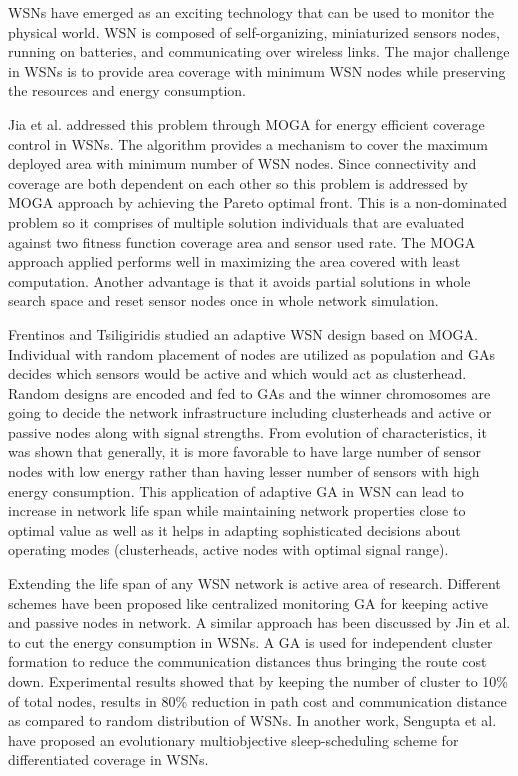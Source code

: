 \documentclass[journal]{IEEEtran}
\begin{document}
WSNs have emerged as an exciting technology that can be used to monitor the physical world. WSN is composed of self-organizing, miniaturized sensors nodes, running on batteries, and communicating over wireless links. The major challenge in WSNs is to provide area coverage with minimum WSN nodes while preserving the resources and energy consumption.

Jia et al. \cite{jia2009energy} addressed this problem through MOGA for energy efficient coverage control in WSNs. The algorithm provides a mechanism to cover the maximum deployed area with minimum number of WSN nodes. Since connectivity and coverage are both dependent on each other so this problem is addressed by MOGA approach by achieving the Pareto optimal front. This is a non-dominated problem so it comprises of multiple solution individuals that are evaluated against two fitness function coverage area and sensor used rate. The MOGA approach applied performs well in maximizing the area covered with least computation. Another advantage is that it avoids partial solutions in whole search space and reset sensor nodes once in whole network simulation.
 
Frentinos and Tsiligiridis \cite{ferentinos2007adaptive} studied an adaptive WSN design based on MOGA. Individual with random placement of nodes are utilized as population and GAs decides which sensors would be active and which would act as clusterhead. Random designs are encoded and fed to GAs and the winner chromosomes are going to decide the network infrastructure including clusterheads and active or passive nodes along with signal strengths. From evolution of characteristics, it was shown that generally, it is more favorable to have large number of sensor nodes with low energy rather than having lesser number of sensors with high energy consumption. This application of adaptive GA in WSN can lead to increase in network life span while maintaining network properties close to optimal value as well as it helps in adapting sophisticated decisions about operating modes (clusterheads, active nodes with optimal signal range).

Extending the life span of any WSN network is active area of research. Different schemes have been proposed like centralized monitoring GA for keeping active and passive nodes in network. A similar approach has been discussed by Jin et al.  \cite{jin2003sensor} to cut the energy consumption in WSNs. A GA is used for independent cluster formation to reduce the communication distances thus bringing the route cost down. Experimental results showed that by keeping the number of cluster to 10\% of total nodes, results in 80\% reduction in path cost and communication distance as compared to random distribution of WSNs. In another work, Sengupta et al. \cite{sengupta2012evolutionary}  have proposed an evolutionary multiobjective sleep-scheduling scheme for differentiated coverage in WSNs.
\end{document}
